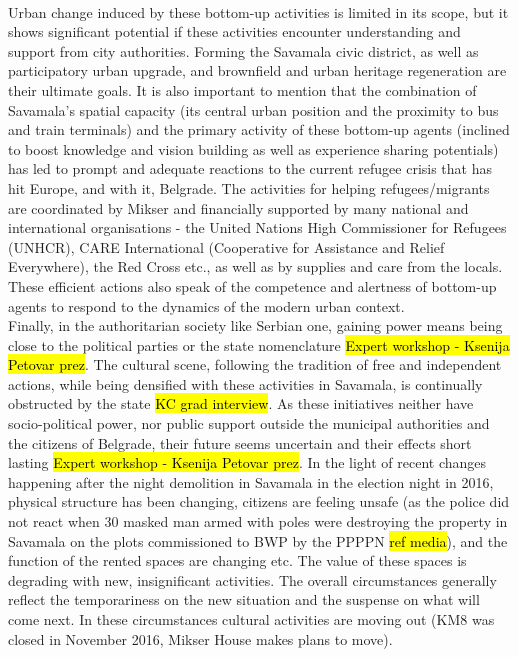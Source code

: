 \documentclass[11pt]{report}
\begin{document}
\\
Urban change induced by these bottom-up activities is limited in its scope, but it shows significant potential if these activities encounter understanding and support from city authorities. Forming the Savamala civic district, as well as participatory urban upgrade, and brownfield and urban heritage regeneration are their ultimate goals. It is also important to mention that the combination of Savamala’s spatial capacity (its central urban position and the proximity to bus and train terminals) and the primary activity of these bottom-up agents (inclined to boost knowledge and vision building as well as experience sharing potentials) has led to prompt and adequate reactions to the current refugee crisis that has hit Europe, and with it, Belgrade. The activities for helping refugees/migrants are coordinated by Mikser and financially supported by many national and international organisations - the United Nations High Commissioner for Refugees (UNHCR), CARE International (Cooperative for Assistance and Relief Everywhere), the Red Cross etc., as well as by supplies and care from the locals.  These efficient actions also speak of the competence and alertness of bottom-up agents to respond to the dynamics of the modern urban context.
\\
Finally, in the authoritarian society like Serbian one, gaining power means being close to the political parties or the state nomenclature \hl{Expert workshop - Ksenija Petovar prez}.
The cultural scene, following the tradition of free and independent actions, while being densified with these activities in Savamala, is continually obstructed by the state \hl{KC grad interview}.
As these initiatives neither have socio-political power, nor public support outside the municipal authorities and the citizens of Belgrade, their future seems uncertain and their effects short lasting \hl{Expert workshop - Ksenija Petovar prez}.
In the light of recent changes happening after the night demolition in Savamala in the election night in 2016, physical structure has been changing, citizens are feeling unsafe (as the police did not react when 30 masked man armed with poles were destroying the property in Savamala on the plots commissioned to BWP by the PPPPN \hl{ref media}), and the function of the rented spaces are changing etc.
The value of these spaces is degrading with new, insignificant activities. The overall circumstances generally reflect the temporariness on the new situation and the suspense on what will come next. In these circumstances cultural activities are moving out (KM8 was closed in November 2016, Mikser House makes plans to move).
\end{document}
